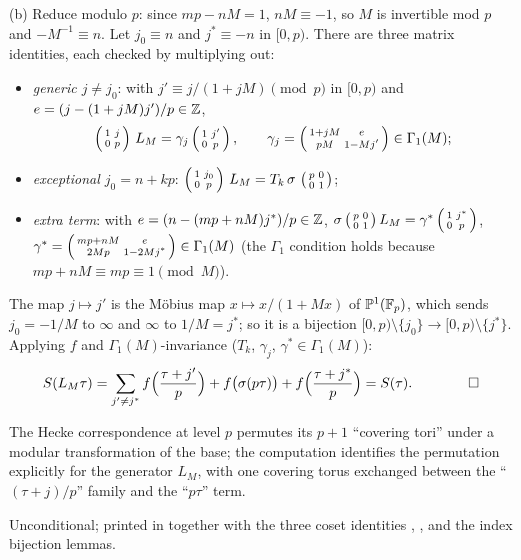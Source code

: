 (b) Reduce modulo $p$: since $mp-nM=1$, $nM\equiv-1$, so $M$ is invertible mod $p$ and $-M^{-1}\equiv n$.  Let
$j_0\equiv n$ and $j^*\equiv-n$ in $[0,p)$.  There are three matrix identities, each checked by multiplying out:
\begin{itemize}
\item \emph{generic $j\ne j_0$}: with $j'\equiv j/(1+jM)\pmod p$ in $[0,p)$ and $e=(j-(1+jM)j')/p\in{\mathbb{Z}}$,
  \begin{equation*}
    \left(\begin{smallmatrix}1&j\\0&p\end{smallmatrix}\right)\,L_M=\gamma_j\left(\begin{smallmatrix}1&j'\\0&p\end{smallmatrix}\right),\qquad \gamma_j=\left(\begin{smallmatrix}1+jM&e\\pM&1-Mj'\end{smallmatrix}\right)\in\Gamma_1(M);
  \end{equation*}
\item \emph{exceptional $j_0=n+kp$}: $\left(\begin{smallmatrix}1&j_0\\0&p\end{smallmatrix}\right)\,L_M=T_k\,\sigma\,\left(\begin{smallmatrix}p&0\\0&1\end{smallmatrix}\right)$;
\item \emph{extra term}: with $e=(n-(mp+nM)j^*)/p\in{\mathbb{Z}}$,
  $\sigma\left(\begin{smallmatrix}p&0\\0&1\end{smallmatrix}\right)L_M=\gamma^*\left(\begin{smallmatrix}1&j^*\\0&p\end{smallmatrix}\right)$, $\gamma^*=\left(\begin{smallmatrix}mp+nM&e\\2Mp&1-2Mj^*\end{smallmatrix}\right)\in\Gamma_1(M)$
  (the $\Gamma_1$ condition holds because $mp+nM\equiv mp\equiv1\pmod M$).
\end{itemize}
The map $j\mapsto j'$ is the M\"obius map $x\mapsto x/(1+Mx)$ of $\mathbb{P}^1(\mathbb F_p)$, which sends $j_0=-1/M$ to
$\infty$ and $\infty$ to $1/M=j^*$; so it is a bijection $[0,p)\setminus\{j_0\}\to[0,p)\setminus\{j^*\}$.  Applying
$f$ and $\Gamma_1(M)$-invariance ($T_k$, $\gamma_j$, $\gamma^*\in\Gamma_1(M)$):
\begin{equation*}
  S(L_M\tau)=\sum_{j'\ne j^*}f\Bigl(\frac{\tau+j'}p\Bigr)+f\bigl(\sigma(p\tau)\bigr)+f\Bigl(\frac{\tau+j^*}p\Bigr)=S(\tau).
  \qquad\qed
\end{equation*}
\begin{physics}
The Hecke correspondence at level $p$ permutes its $p+1$ ``covering tori'' under a modular transformation of the base;
the computation identifies the permutation explicitly for the generator $L_M$, with one covering torus exchanged
between the ``$(\tau+j)/p$'' family and the ``$p\tau$'' term.
\end{physics}
\begin{status}
Unconditional; printed in  together with the three coset
identities , ,  and the
index bijection lemmas.
\end{status}


